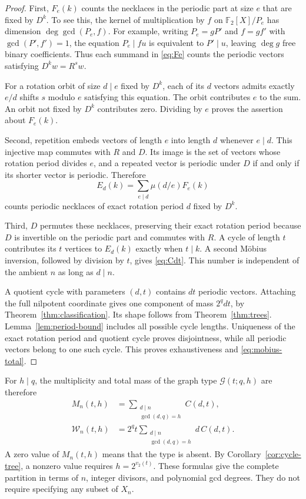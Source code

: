 \documentclass[11pt]{article}
\theoremstyle{definition}
\theoremstyle{remark}
\numberwithin{equation}{section}
\newcommand{\F}{\mathbb F_2}
\newcommand{\G}{\mathcal G}
\begin{document}
\begin{proof}
First, $F_e(k)$ counts the necklaces in the periodic part at size $e$
that are fixed by $D^k$. To see this, the kernel of multiplication by
$f$ on $\F[X]/P_e$ has dimension $\deg\gcd(P_e,f)$. For example,
writing $P_e=gP'$ and $f=gf'$ with $\gcd(P',f')=1$, the equation
$P_e\mid fu$ is equivalent to $P'\mid u$, leaving $\deg g$ free
binary coefficients. Thus each summand in \eqref{eq:Fe} counts the
periodic vectors satisfying $D^k w=R^s w$.

For a rotation orbit of size $d\mid e$ fixed by $D^k$, each of its
$d$ vectors admits exactly $e/d$ shifts $s$ modulo $e$ satisfying this
equation. The orbit contributes $e$ to the sum. An orbit not fixed by
$D^k$ contributes zero. Dividing by $e$ proves the assertion about
$F_e(k)$.

Second, repetition embeds vectors of length $e$ into length $d$ whenever
$e\mid d$. This injective map commutes with $R$ and $D$. Its image is
the set of vectors whose rotation period divides $e$, and a repeated
vector is periodic under $D$ if and only if its shorter vector is
periodic. Therefore
\[
 E_d(k)=\sum_{e\mid d}\mu(d/e)F_e(k)
\]
counts periodic necklaces of exact rotation period $d$ fixed by $D^k$.

Third, $D$ permutes these necklaces, preserving their exact rotation
period because $D$ is invertible on the periodic part and commutes with
$R$. A cycle of length $t$ contributes its $t$ vertices to $E_d(k)$
exactly when $t\mid k$. A second M\"obius inversion, followed by
division by $t$, gives \eqref{eq:Cdt}. This number is independent of
the ambient $n$ as long as $d\mid n$.

A quotient cycle with parameters $(d,t)$ contains $dt$ periodic vectors.
Attaching the full nilpotent coordinate gives one component of mass
$2^qdt$, by Theorem~\ref{thm:classification}. Its shape follows from
Theorem~\ref{thm:trees}. Lemma~\ref{lem:period-bound} includes all possible
cycle lengths. Uniqueness of the exact rotation period and quotient cycle
proves disjointness, while all periodic vectors belong to one such cycle.
This proves exhaustiveness and \eqref{eq:mobius-total}.
\end{proof}

For $h\mid q$, the multiplicity and total mass of the graph type
$\G(t;q,h)$ are therefore
\begin{align}
 M_n(t,h)&=\sum_{\substack{d\mid n\\\gcd(d,q)=h}}C(d,t),
 \label{eq:type-multiplicity}\\
 \mathcal W_n(t,h)&=2^q t
 \sum_{\substack{d\mid n\\\gcd(d,q)=h}}d\,C(d,t).
 \label{eq:type-mass}
\end{align}
A zero value of $M_n(t,h)$ means that the type is absent. By
Corollary~\ref{cor:cycle-tree}, a nonzero value requires
$h=2^{v_2(t)}$. These formulas give the complete partition in terms of
$n$, integer divisors, and polynomial gcd degrees. They do not require
specifying any subset of $X_n$.
\end{document}
